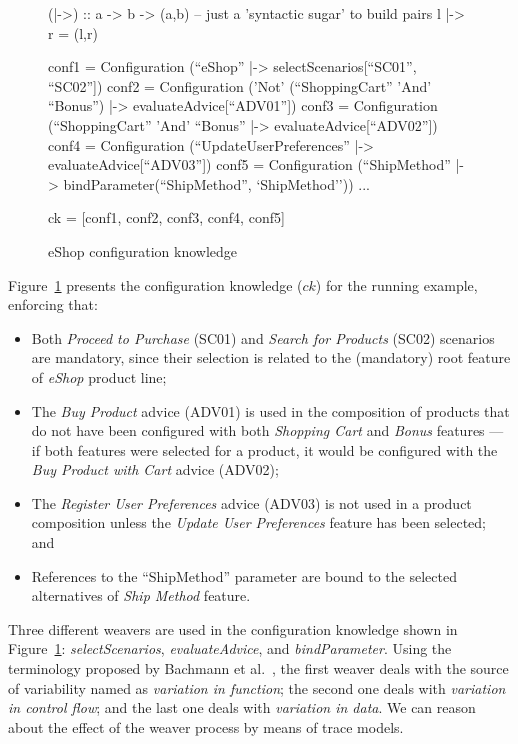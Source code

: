 \documentclass{acm_proc_article-sp}
\begin{document}
\begin{figure}[hbt] 
 \begin{code}
  (|->) :: a -> b -> (a,b) -- just a 'syntactic sugar' to build pairs
  l |-> r = (l,r)
  
  conf1 = Configuration (``eShop'' |-> selectScenarios[``SC01'', ``SC02''])
  conf2 = Configuration ('Not' (``ShoppingCart'' 'And' ``Bonus'') |-> evaluateAdvice[``ADV01''])
  conf3 = Configuration (``ShoppingCart'' 'And' ``Bonus'' |-> evaluateAdvice[``ADV02''])
  conf4 = Configuration (``UpdateUserPreferences'' |-> evaluateAdvice[``ADV03''])
  conf5 = Configuration (``ShipMethod'' |-> bindParameter(``ShipMethod'', `ShipMethod'')) 
  ...
  
  ck = [conf1, conf2, conf3, conf4, conf5]
 \end{code}
\caption{eShop configuration knowledge} 
\label{fig:ck-running-example}
\end{figure}

Figure~\ref{fig:ck-running-example} presents the configuration knowledge
($ck$) for the running example, enforcing that:

\begin{itemize}  
\item Both \emph{Proceed to Purchase} (SC01) and \emph{Search for Products}
(SC02) scenarios are mandatory, since their selection is related to the
(mandatory) root feature of \emph{eShop} product line;

\item The \emph{Buy Product} advice (ADV01) is used in the composition of
products that do not have been configured with both \emph{Shopping Cart} and \emph{Bonus}
features --- if both features were selected for a product, it would be configured
with the \emph{Buy Product with Cart} advice (ADV02);

\item The \emph{Register User Preferences} advice (ADV03) is not used in a
product composition unless the \emph{Update User Preferences} feature has been
selected; and
 
\item References to the ``ShipMethod'' parameter are bound to the
selected alternatives of \emph{Ship Method} feature.

\end{itemize}  

Three different weavers are used in the configuration knowledge shown in
Figure~\ref{fig:ck-running-example}: \emph{selectScenarios},
\emph{evaluateAdvice}, and \emph{bindParameter}. Using the terminology
proposed by Bachmann et al.~\cite{Bachmann:2001aa}, the first weaver deals with
the source of variability named as \emph{variation in function}; the second one
deals with \emph{variation in control flow}; and the last one deals with
\emph{variation in data}. We can reason about the effect of the weaver process
by means of trace models. 
\end{document}
